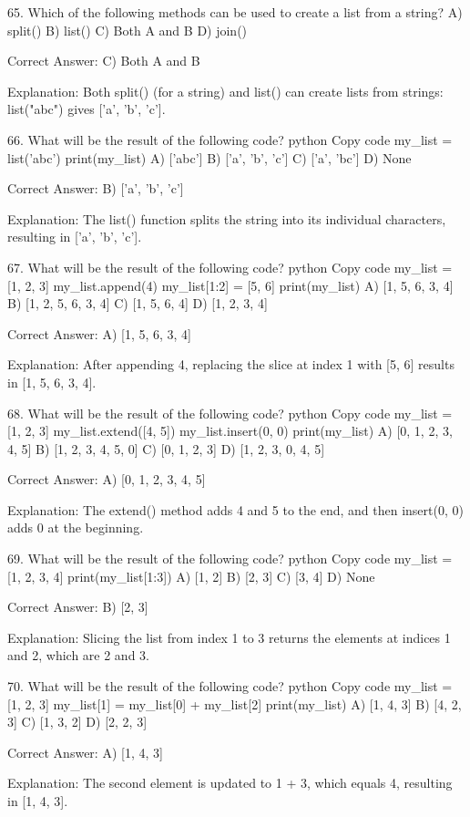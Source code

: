 65. Which of the following methods can be used to create a list from a string?
A) split()
B) list()
C) Both A and B
D) join()

Correct Answer: C) Both A and B

Explanation:
Both split() (for a string) and list() can create lists from strings: list("abc") gives ['a', 'b', 'c'].

66. What will be the result of the following code?
python
Copy code
my_list = list('abc')
print(my_list)
A) ['abc']
B) ['a', 'b', 'c']
C) ['a', 'bc']
D) None

Correct Answer: B) ['a', 'b', 'c']

Explanation:
The list() function splits the string into its individual characters, resulting in ['a', 'b', 'c'].

67. What will be the result of the following code?
python
Copy code
my_list = [1, 2, 3]
my_list.append(4)
my_list[1:2] = [5, 6]
print(my_list)
A) [1, 5, 6, 3, 4]
B) [1, 2, 5, 6, 3, 4]
C) [1, 5, 6, 4]
D) [1, 2, 3, 4]

Correct Answer: A) [1, 5, 6, 3, 4]

Explanation:
After appending 4, replacing the slice at index 1 with [5, 6] results in [1, 5, 6, 3, 4].

68. What will be the result of the following code?
python
Copy code
my_list = [1, 2, 3]
my_list.extend([4, 5])
my_list.insert(0, 0)
print(my_list)
A) [0, 1, 2, 3, 4, 5]
B) [1, 2, 3, 4, 5, 0]
C) [0, 1, 2, 3]
D) [1, 2, 3, 0, 4, 5]

Correct Answer: A) [0, 1, 2, 3, 4, 5]

Explanation:
The extend() method adds 4 and 5 to the end, and then insert(0, 0) adds 0 at the beginning.

69. What will be the result of the following code?
python
Copy code
my_list = [1, 2, 3, 4]
print(my_list[1:3])
A) [1, 2]
B) [2, 3]
C) [3, 4]
D) None

Correct Answer: B) [2, 3]

Explanation:
Slicing the list from index 1 to 3 returns the elements at indices 1 and 2, which are 2 and 3.

70. What will be the result of the following code?
python
Copy code
my_list = [1, 2, 3]
my_list[1] = my_list[0] + my_list[2]
print(my_list)
A) [1, 4, 3]
B) [4, 2, 3]
C) [1, 3, 2]
D) [2, 2, 3]

Correct Answer: A) [1, 4, 3]

Explanation:
The second element is updated to 1 + 3, which equals 4, resulting in [1, 4, 3].

